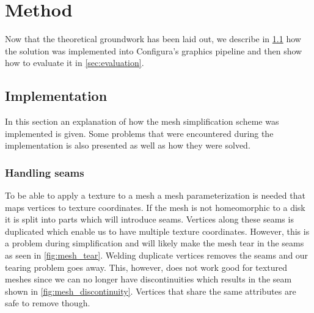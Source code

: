 

\chapter{Method} \label{cha:method}
  Now that the theoretical groundwork has been laid out, we describe in \cref{sec:implementation} how the solution was implemented into Configura's graphics pipeline and then show how to evaluate it in \cref{sec:evaluation}.
  

\section{Implementation} \label{sec:implementation}
In this section an explanation of how the mesh simplification scheme was implemented is given. Some problems that were encountered during the implementation is also presented as well as how they were solved.

\subsection{Handling seams}
To be able to apply a texture to a mesh a mesh parameterization is needed that maps vertices to texture coordinates. If the mesh is not homeomorphic to a disk it is split into parts which will introduce seams. Vertices along these seams is duplicated which enable us to have multiple texture coordinates. However, this is a problem during simplification and will likely make the mesh tear in the seams as seen in \cref{fig:mesh_tear}. Welding duplicate vertices removes the seams and our tearing problem goes away. This, however, does not work good for textured meshes since we can no longer have discontinuities which results in the seam shown in \cref{fig:mesh_discontinuity}. Vertices that share the same attributes are safe to remove though.

